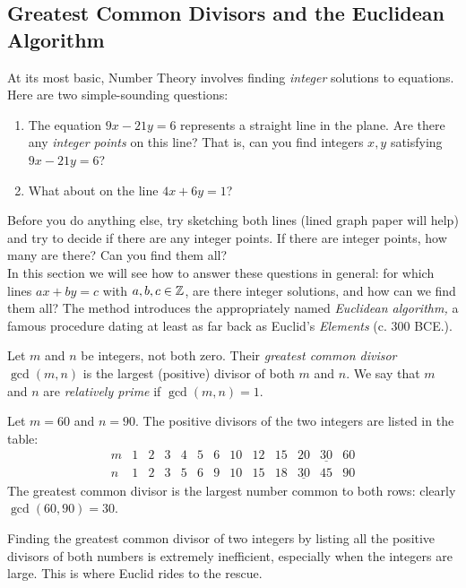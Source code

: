 \clearpage


\subsection{Greatest Common Divisors and the Euclidean Algorithm}\label{sec:gcd}

At its most basic, Number Theory involves finding \emph{integer} solutions to equations. Here are two simple-sounding questions:
\begin{enumerate}
  \item The equation $9x-21y=6$ represents a straight line in the plane. Are there any \emph{integer points} on this line? That is, can you find integers $x,y$ satisfying $9x-21y=6$?
  \item What about on the line $4x+6y=1$?
\end{enumerate}
Before you do anything else, try sketching both lines (lined graph paper will help) and try to decide if there are any integer points. If there are integer points, how many are there? Can you find them all?\\

In this section we will see how to answer these questions in general: for which lines $ax+by=c$ with $a,b,c\in\mathbb{Z}$, are there integer solutions, and how can we find them all? The method introduces the appropriately named \emph{Euclidean algorithm,} a famous procedure dating at least as far back as Euclid's \emph{Elements} (c. 300 BCE.).

\begin{defn}{}{}
Let $m$ and $n$ be integers, not both zero. Their \emph{greatest common divisor} $\gcd(m,n)$ is the largest (positive) divisor of both $m$ and $n$. We say that $m$ and $n$ are \emph{relatively prime} if $\gcd(m,n)=1$.
\end{defn}

\begin{example}{}{}
Let $m=60$ and $n=90$. The positive divisors of the two integers are listed in the table:
\[\begin{array}{c|cccccccccccc}
m&1&2&3&4&5&6&10&12&15&20&\underline{30}&60\\\hline
n&1&2&3&5&6&9&10&15&18&\underline{30}&45&90
\end{array}\]
The greatest common divisor is the largest number common to both rows: clearly $\gcd(60,90)=30$.
\end{example}

Finding the greatest common divisor of two integers by listing all the positive divisors of both numbers is extremely inefficient, especially when the integers are large. This is where Euclid rides to the rescue.\\

